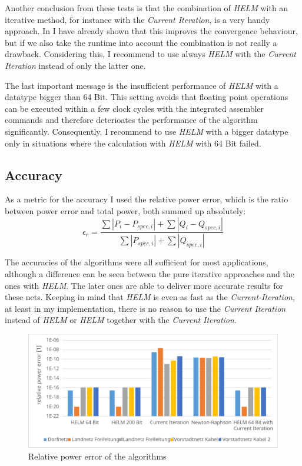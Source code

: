 Another conclusion from these tests is that the combination of \emph{HELM} with an iterative method, for instance with the \emph{Current Iteration}, is a very handy approach. In  I have already shown that this improves the convergence behaviour, but if we also take the runtime into account the combination is not really a drawback. Considering this, I recommend to use always \emph{HELM} with the \emph{Current Iteration} instead of only the latter one.

The last important message is the insufficient performance of \emph{HELM} with a datatype bigger than 64 Bit. This setting avoids that floating point operations can be executed within a few clock cycles with the integrated assembler commands and therefore deterioates the performance of the algorithm significantly. Consequently, I recommend to use \emph{HELM} with a bigger datatype only in situations where the calculation with \emph{HELM} with 64 Bit failed.

\subsection{Accuracy}

As a metric for the accuracy I used the relative power error, which is the ratio between power error and total power, both summed up absolutely:
\begin{equation}
	\epsilon_r = \frac{\sum |P_i - P_{spec,i}| + \sum |Q_i - Q_{spec,i}|}{\sum |P_{spec,i}| + \sum |Q_{spec,i}|}
\end{equation}

The accuracies of the algorithms  were all sufficient for most applications, although a difference can be seen between the pure iterative approaches and the ones with \emph{HELM}. The later ones are able to deliver more accurate results for these nets. Keeping in mind that \emph{HELM} is even as fast as the \emph{Current-Iteration}, at least in my implementation, there is no reason to use the \emph{Current Iteration} instead of \emph{HELM} or \emph{HELM} together with the \emph{Current Iteration}.

\begin{figure}
	\centering
	\includegraphics[scale=0.7]{figures/comparison_accuracy}
	\caption[Comparison, accuracy]{Relative power error of the algorithms}
	\label{fig:comparison_accuracy}
\end{figure}

